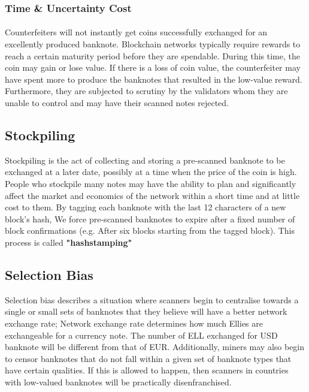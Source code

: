 \vspace{1mm}
\subsubsection{Time \& Uncertainty Cost}
\paragraph{}Counterfeiters will not instantly get coins successfully exchanged for an excellently produced banknote. Blockchain networks typically require rewards to reach a certain maturity period before they are spendable. During this time, the coin may gain or lose value. If there is a loss of coin value, the counterfeiter may have spent more to produce the banknotes that resulted in the low-value reward. Furthermore, they are subjected to scrutiny by the validators whom they are unable to control and may have their scanned notes rejected.  


\vspace{1mm}
\subsection{Stockpiling}
Stockpiling is the act of collecting and storing a pre-scanned banknote to be exchanged at a later date, possibly at a time when the price of the coin is high. People who stockpile many notes may have the ability to plan and significantly affect the market and economics of the network within a short time and at little cost to them. By tagging each banknote with the last 12 characters of a new block's hash, We force pre-scanned banknotes to expire after a fixed number of block confirmations (e.g. After six blocks starting from the tagged block).  This process is called \textbf{"hashstamping"}


\newpage
\subsection{Selection Bias}
Selection bias describes a situation where scanners begin to centralise towards a single or small sets of banknotes that they believe will have a better network exchange rate; Network exchange rate determines how much Ellies are exchangeable for a currency note. The number of ELL exchanged for USD banknote will be different from that of EUR. Additionally, miners may also begin to censor banknotes that do not fall within a given set of banknote types that have certain qualities. If this is allowed to happen, then scanners in countries with low-valued banknotes will be practically disenfranchised. 

